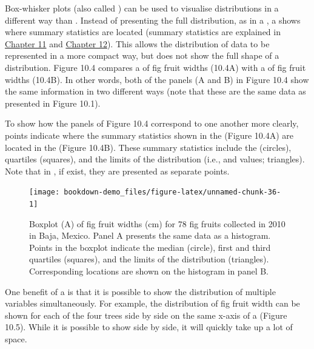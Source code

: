 \documentclass[
  openany]{krantz}
\begin{document}
Box-whisker plots (also called ) can be used to visualise distributions in a different way than .
Instead of presenting the full distribution, as in a , a  shows where summary statistics are located (summary statistics are explained in \protect\hyperlink{Chapter_11}{Chapter 11} and \protect\hyperlink{Chapter_12}{Chapter 12}).
This allows the distribution of data to be represented in a more compact way, but does not show the full shape of a distribution.
Figure 10.4 compares a  of fig fruit widths (10.4A) with a  of fig fruit widths (10.4B).
In other words, both of the panels (A and B) in Figure 10.4 show the same information in two different ways (note that these are the same data as presented in Figure 10.1).

To show how the panels of Figure 10.4 correspond to one another more clearly, points indicate where the summary statistics shown in the  (Figure 10.4A) are located in the  (Figure 10.4B).
These summary statistics include the  (circles), quartiles (squares), and the limits of the distribution (i.e.,  and  values; triangles).
Note that in , if  exist, they are presented as separate points.

\begin{figure}
\texttt{[image: bookdown-demo\_files/figure-latex/unnamed-chunk-36-1]} \caption{Boxplot (A) of fig fruit widths (cm) for 78 fig fruits collected in 2010 in Baja, Mexico. Panel A presents the same data as a histogram. Points in the boxplot indicate the median (circle), first and third quartiles (squares), and the limits of the distribution (triangles). Corresponding locations are shown on the histogram in panel B.}\label{fig:unnamed-chunk-36}
\end{figure}

One benefit of a  is that it is possible to show the distribution of multiple variables simultaneously.
For example, the distribution of fig fruit width can be shown for each of the four trees side by side on the same x-axis of a  (Figure 10.5).
While it is possible to show  side by side, it will quickly take up a lot of space.

\newpage
\end{document}
